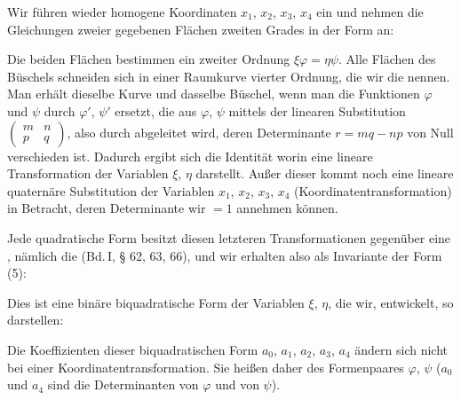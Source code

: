 Wir führen wieder homogene Koordinaten $x_1$, $x_2$, $x_3$, $x_4$ ein
und nehmen die Gleichungen zweier gegebenen Flächen zweiten
Grades in der Form an:

Die beiden Flächen bestimmen ein  zweiter
Ordnung $\xi\varphi=\eta\psi$. Alle Flächen des Büschels schneiden sich
in einer Raumkurve vierter Ordnung, die wir die 
nennen. Man erhält dieselbe Kurve und dasselbe Büschel, wenn
man die Funktionen $\varphi$ und $\psi$ durch $\varphi'$, $\psi'$ ersetzt, die aus $\varphi$, $\psi$
mittels der linearen Substitution $\begin{pmatrix} m & n \\ p & q \end{pmatrix}$, also durch
abgeleitet wird, deren Determinante $r=mq-np$ von Null
verschieden ist. Dadurch ergibt sich die Identität
worin
eine lineare Transformation der Variablen $\xi$, $\eta$ darstellt. Außer
dieser  kommt noch eine lineare quaternäre Substitution der Variablen $x_1$, $x_2$, $x_3$, $x_4$ (Koordinatentransformation) in Betracht, deren Determinante wir $=1$ annehmen
können.

Jede quadratische Form besitzt diesen letzteren Transformationen gegenüber eine , nämlich die  (Bd.\,I, § 62, 63, 66), und wir erhalten also als
Invariante der Form (5):

Dies ist eine binäre biquadratische Form der Variablen $\xi$, $\eta$,
die wir, entwickelt, so darstellen:

Die Koeffizienten dieser biquadratischen Form $a_0$, $a_1$, $a_2$, $a_3$, $a_4$
ändern sich nicht bei einer Koordinatentransformation. Sie heißen
daher  des Formenpaares $\varphi$, $\psi$ ($a_0$ und
$a_4$ sind die Determinanten von $\varphi$ und von $\psi$).
